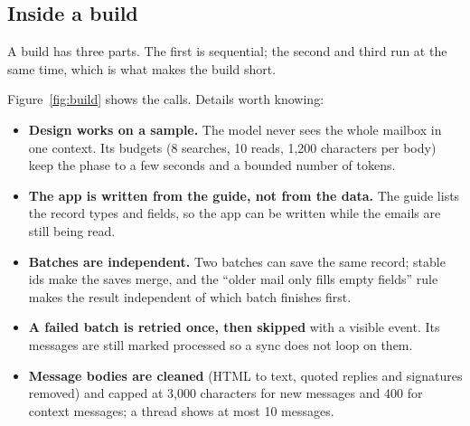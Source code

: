 \documentclass[10pt,a4paper]{article}
\begin{document}
\subsection{Inside a build}
\label{sec:build}

A build has three parts. The first is sequential; the second and third run at the same time,
which is what makes the build short.

Figure~\ref{fig:build} shows the calls. Details worth knowing:
\begin{itemize}
\item \textbf{Design works on a sample.} The model never sees the whole mailbox in one context. Its budgets (8 searches, 10 reads, 1,200 characters per body) keep the phase to a few seconds and a bounded number of tokens.
\item \textbf{The app is written from the guide, not from the data.} The guide lists the record types and fields, so the app can be written while the emails are still being read.
\item \textbf{Batches are independent.} Two batches can save the same record; stable ids make the saves merge, and the ``older mail only fills empty fields'' rule makes the result independent of which batch finishes first.
\item \textbf{A failed batch is retried once, then skipped} with a visible event. Its messages are still marked processed so a sync does not loop on them.
\item \textbf{Message bodies are cleaned} (HTML to text, quoted replies and signatures removed) and capped at 3,000 characters for new messages and 400 for context messages; a thread shows at most 10 messages.
\end{itemize}
\end{document}

